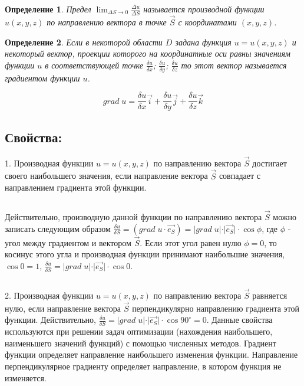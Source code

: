 \documentclass[a4paper,14pt]{article}
\newtheorem{definition}{Определение}
\begin{document}
    \begin{definition}
        Предел $\lim_{\Delta{S}\to{0}}\frac{\Delta{u}}{\Delta{S}}$ называется \textit{производной функции $u(x,y,z)$ по направлению вектора} 
        в точке $\vec{S}$ с координатами $(x,y,z)$.
    \end{definition}

    \begin{definition}
        Если в некоторой области $D$ задана функция $u=u(x,y,z)$ и некоторый вектор, 
        проекции которого на координатные оси равны значениям функции $u$ в соответствующей точке $\frac{\delta{u}}{\delta{x}}$; $\frac{\delta{u}}{\delta{y}}$; $\frac{\delta{u}}{\delta{z}}$
        то этот вектор называется \textit{градиентом функции $u$}.
    \end{definition}

    $$grad\;u=\frac{\delta{u}}{\delta{x}}\vec{i}+\frac{\delta{u}}{\delta{y}}\vec{j}+\frac{\delta{u}}{\delta{z}}\vec{k}$$

    \subsection{Свойства:}

    1. Производная функции $u=u(x,y,z)$ по направлению вектора $\vec{S}$ достигает своего наибольшего значения, если направление вектора $\vec{S}$ 
    совпадает с направлением градиента этой функции.

    $\;$

    Действительно, производную данной функции по направлению вектора $\vec{S}$ можно записать следующим образом 
    $\frac{\delta{u}}{\delta{S}}=(grad\;u\cdot\vec{e_S})=\vert{grad\;u}\vert\cdot\vert\vec{e_S}\vert\cdot\cos{\phi}$, где $\phi$ - угол между градиентом и вектором $\vec{S}$. 
    Если этот угол равен нулю $\phi=0$, то косинус этого угла и производная функции принимают наибольшие значения, $\cos{0}=1$, $\frac{\delta{u}}{\delta{S}}=\vert{grad\;u}\vert\cdot\vert\vec{e_S}\vert\cdot\cos{0}$.

    $\;$

    2. Производная функции $u=u(x,y,z)$ по направлению вектора $\vec{S}$ равняется нулю, если направление вектора $\vec{S}$ перпендикулярно направлению градиента этой функции.
    Действительно, $\frac{\delta{u}}{\delta{S}}=\vert{grad\;u}\vert\cdot\vert\vec{e_S}\vert\cdot\cos{90^\circ}=0$.
    Данные свойства используются при решении задач оптимизации (нахождения наибольшего, наименьшего значений функций) с помощью численных методов. 
    Градиент функции определяет направление наибольшего изменения функции. 
    Направление перпендикулярное градиенту определяет направление, в котором функция не изменяется.
\end{document}
